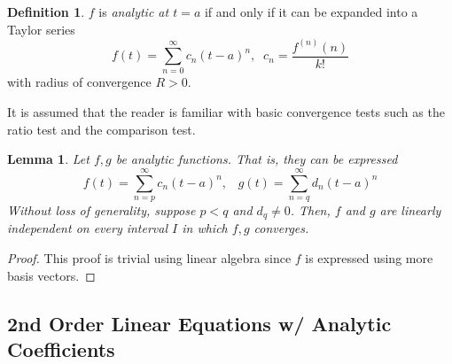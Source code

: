 \documentclass{article}
\newtheorem{lemma}[theorem]{Lemma}
\theoremstyle{remark}
\theoremstyle{definition}
\newtheorem{definition}{Definition}[section]
\begin{document}
    \begin{definition}
    $f$ is \textit{analytic at $t=a$} if and only if it can be expanded into a Taylor series 
    \[f(t) = \sum_{n=0}^\infty c_n (t-a)^n, \;\; c_n = \frac{f^{(n)}(n)}{k!}\]
    with radius of convergence $R > 0$. 
    \end{definition}
    It is assumed that the reader is familiar with basic convergence tests such as the ratio test and the comparison test. 

    \begin{lemma}
    Let $f, g$ be analytic functions. That is, they can be expressed
    \[f(t) = \sum_{n=p}^\infty c_n (t-a)^n, \;\;\; g(t) = \sum_{n=q}^\infty d_n (t-a)^n\]
    Without loss of generality, suppose $p < q$ and $d_q \neq 0$. Then, $f$ and $g$ are linearly independent on every interval $I$ in which $f, g$ converges. 
    \end{lemma}
    \begin{proof}
    This proof is trivial using linear algebra since $f$ is expressed using more basis vectors. 
    \end{proof}

  \subsection{2nd Order Linear Equations w/ Analytic Coefficients}
\end{document}
